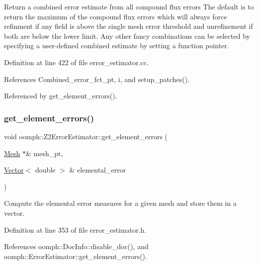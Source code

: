 Return a combined error estimate from all compound flux errors The default is to return the maximum of the compound flux errors which will always force refinment if any field is above the single mesh error threshold and unrefinement if both are below the lower limit. Any other fancy combinations can be selected by specifying a user-\/defined combined estimate by setting a function pointer. 

Definition at line 422 of file error\+\_\+estimator.\+cc.



References Combined\+\_\+error\+\_\+fct\+\_\+pt, i, and setup\+\_\+patches().



Referenced by get\+\_\+element\+\_\+errors().

\mbox{\label{classoomph_1_1Z2ErrorEstimator_aa38b3ecfbb223a91bfe049d4722af6d3}} 
\subsubsection{\texorpdfstring{get\+\_\+element\+\_\+errors()}{get\_element\_errors()}\hspace{0.1cm}{\footnotesize\ttfamily [1/2]}}
{\footnotesize\ttfamily void oomph\+::\+Z2\+Error\+Estimator\+::get\+\_\+element\+\_\+errors (\begin{DoxyParamCaption}\item[{\hyperlink{classoomph_1_1Mesh}{Mesh} $\ast$\&}]{mesh\+\_\+pt,  }\item[{\hyperlink{classoomph_1_1Vector}{Vector}$<$ double $>$ \&}]{elemental\+\_\+error }\end{DoxyParamCaption})\hspace{0.3cm}{\ttfamily [inline]}}



Compute the elemental error measures for a given mesh and store them in a vector. 



Definition at line 353 of file error\+\_\+estimator.\+h.



References oomph\+::\+Doc\+Info\+::disable\+\_\+doc(), and oomph\+::\+Error\+Estimator\+::get\+\_\+element\+\_\+errors().

